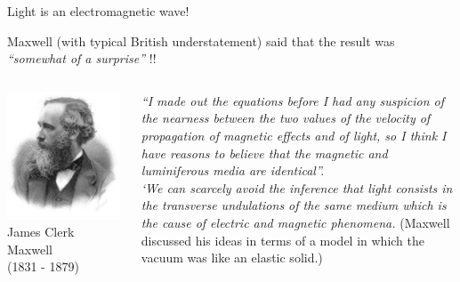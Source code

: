 %
%
%
%

\begin{frame}{Light is an electromagnetic wave!}

Maxwell (with typical British understatement) said that the result
was {\em ``somewhat of a surprise''} !!\\
\vspace{0.1cm}

\begin{columns}
  \begin{column}{0.40\textwidth}
   \begin{center}
    \includegraphics[width=0.98\textwidth]{./images/people/maxwell.jpg}\\
     {\small
       James Clerk Maxwell\\
       (1831 - 1879)
     }
   \end{center}
  \end{column}
  \begin{column}{0.60\textwidth}
  {\small
       {\em ``I made out the equations before I had any suspicion of the nearness between
       the two values of the velocity of propagation of magnetic effects and of light, so I think
       I have reasons to believe that the magnetic and luminiferous media are identical''.}\\
       \vspace{0.3cm}
       {\em `We can scarcely avoid the inference that light consists in the transverse undulations
       of the same medium which is the cause of electric and magnetic phenomena.}
       (Maxwell discussed his ideas in terms of a model in which the vacuum was like an elastic solid.)
  }
  \end{column}
\end{columns}

\end{frame}


